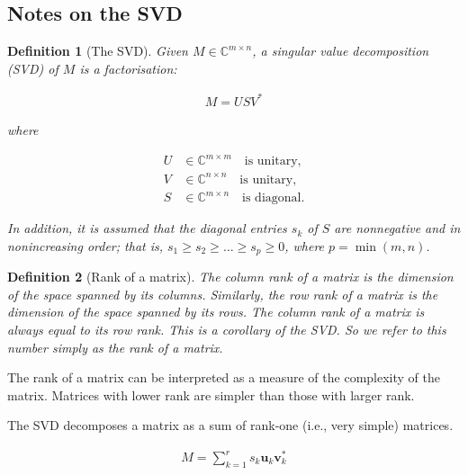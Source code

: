 \documentclass[12pt]{article}
\newtheorem{definition}{Definition}
\begin{document}
\pagebreak
\begin{appendices}

\section{Notes on the SVD}
\label{sec:notesOnTheSVD}

    \begin{definition}[The SVD]
        Given $M\in\mathbb{C}^{m\times n}$, a singular value decomposition (SVD)
        of $M$ is a factorisation:

        \begin{align*}
            M = USV^*
        \end{align*}

        where

        \begin{align*}
            U &\in \mathbb{C}^{m\times m}\quad\text{is unitary,}\\
            V &\in \mathbb{C}^{n\times n}\quad\text{is unitary,}\\
            S &\in \mathbb{C}^{m\times n}\quad\text{is diagonal.}
        \end{align*}

        In addition, it is assumed that the diagonal entries $s_k$ of $S$ are
        nonnegative and in nonincreasing order; that is, $s_1\ge
        s_2\ge\ldots\ge s_p\ge 0$, where $p=\min(m, n)$.
    \end{definition}

    \begin{definition}[Rank of a matrix]

        The column rank of a matrix is the dimension of the space spanned by
        its columns. Similarly, the row rank of a matrix is the dimension of
        the space spanned by its rows. The column rank of a matrix is always
        equal to its row rank. This is a corollary of the SVD. So we refer to
        this number simply as the rank of a matrix.

        \label{def:rank}
    \end{definition}

    The rank of a matrix can be interpreted as a measure of the complexity of
    the matrix. Matrices with lower rank are simpler than those with larger
    rank.

    The SVD decomposes a matrix as a sum of rank-one (i.e., very simple)
    matrices. 

    \begin{align*}
        M = \sum_{k=1}^rs_k\mathbf{u}_k\mathbf{v}_k^*
    \end{align*}


\end{appendices}
\end{document}
